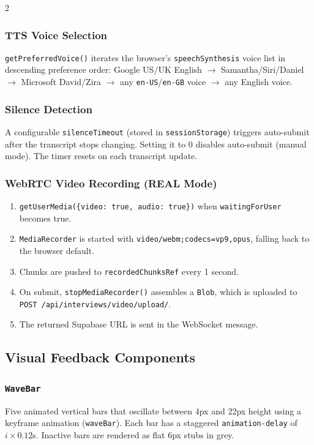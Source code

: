 \documentclass[10pt, a4paper]{article}
\begin{document}
\begin{multicols}{2}
\subsubsection{TTS Voice Selection}
\texttt{getPreferredVoice()} iterates the browser's \texttt{speechSynthesis}
voice list in descending preference order:
Google US/UK English $\to$ Samantha/Siri/Daniel $\to$ Microsoft David/Zira
$\to$ any \texttt{en-US}/\texttt{en-GB} voice $\to$ any English voice.

\subsubsection{Silence Detection}
A configurable \texttt{silenceTimeout} (stored in \texttt{sessionStorage})
triggers auto-submit after the transcript stops changing. Setting it to 0
disables auto-submit (manual mode). The timer resets on each transcript
update.

\subsubsection{WebRTC Video Recording (REAL Mode)}
\begin{enumerate}
  \item \texttt{getUserMedia(\{video: true, audio: true\})} when
        \texttt{waitingForUser} becomes true.
  \item \texttt{MediaRecorder} is started with
        \texttt{video/webm;codecs=vp9,opus}, falling back to the browser
        default.
  \item Chunks are pushed to \texttt{recordedChunksRef} every 1 second.
  \item On submit, \texttt{stopMediaRecorder()} assembles a \texttt{Blob},
        which is uploaded to \texttt{POST /api/interviews/video/upload/}.
  \item The returned Supabase URL is sent in the WebSocket message.
\end{enumerate}

\subsection{Visual Feedback Components}
\subsubsection{\texttt{WaveBar}}
Five animated vertical bars that oscillate between 4px and 22px height
using a keyframe animation (\texttt{waveBar}). Each bar has a staggered
\texttt{animation-delay} of $i \times 0.12$s. Inactive bars are rendered
as flat 6px stubs in grey.


\end{multicols}
\end{document}
